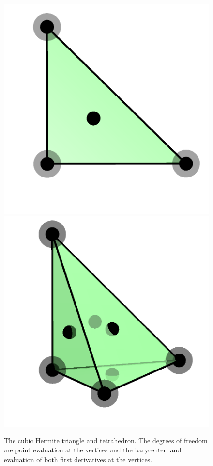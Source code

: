 \begin{figure}
  \begin{center}
    \includegraphics[width=\elmfigsizedouble]{chapters/kirby-6/png/HER_2d.png}
    \includegraphics[width=\elmfigsizedouble]{chapters/kirby-6/png/HER_3d.png}
    \caption{The cubic Hermite triangle and tetrahedron. The degrees
      of freedom are point evaluation at the vertices and the
      barycenter, and evaluation of both first derivatives at the
      vertices.}
  \end{center}
\end{figure}

